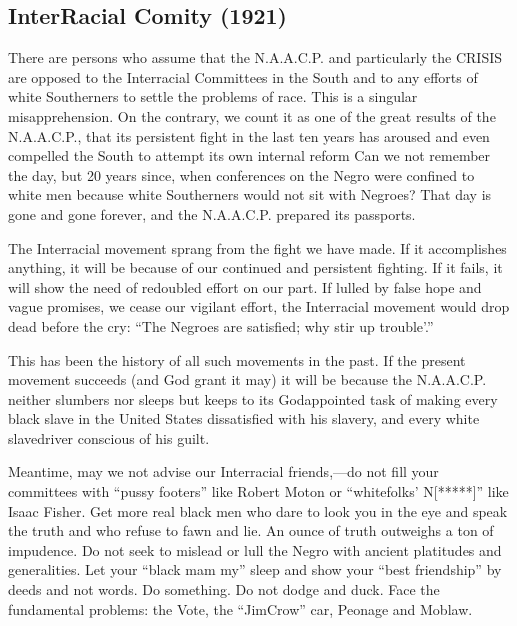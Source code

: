 \documentclass[letterpaper,10pt,english]{jupyterBook}
\begin{document}
\subsection{Inter\sphinxhyphen{}Racial Comity (1921)}
\label{\detokenize{Volumes/22/01/inter-racial_comity:inter-racial-comity-1921}}\label{\detokenize{Volumes/22/01/inter-racial_comity::doc}}
\sphinxAtStartPar
There are persons who assume that the N.A.A.C.P. and particularly the CRISIS are opposed to the Inter\sphinxhyphen{}racial Committees in the South and to any efforts of white Southerners to settle the problems of race. This is a singu­lar misapprehension. On the contrary, we count it as one of the great results of the N.A.A.C.P., that its persistent fight in the last ten years has aroused and even compelled the South to attempt its own internal reform Can we not remember the day, but 20 years since, when conferences on the Negro were confined to white men because white Southerners would not sit with Negroes? That day is gone and gone forever, and the N.A.A.C.P. prepared its passports.

\sphinxAtStartPar
The Inter\sphinxhyphen{}racial movement sprang from the fight we have made. If it accomplishes anything, it will be because of our continued and persistent fighting. If it fails, it will show the need of redoubled effort on our part. If lulled by false hope and vague promises, we cease our vigilant effort, the Inter\sphinxhyphen{}racial movement would drop dead before the cry: “The Negroes are satisfied; why stir up trouble’.”

\sphinxAtStartPar
This has been the history of all such movements in the past. If the present movement succeeds (and God grant it may) it will be because the N.A.A.C.P. neither slumbers nor sleeps but keeps to its God\sphinxhyphen{}appointed task of making every black slave in the United States dissatisfied with his slavery, and every white slave\sphinxhyphen{}driver conscious of his guilt.

\sphinxAtStartPar
Meantime, may we not advise our Inter\sphinxhyphen{}racial friends,—do not fill your committees with “pussy footers” like Robert Moton or “white\sphinxhyphen{}folks’ N{[}*****{]}” like Isaac Fisher. Get more real black men who dare to look you in the eye and speak the truth and who refuse to fawn and lie. An ounce of truth outweighs a ton of impudence. Do not seek to mislead or lull the Negro with ancient platitudes and generalities. Let your “black mam­ my” sleep and show your “best friendship” by deeds and not words. Do something. Do not dodge and duck. Face the fundamental problems: the Vote, the “Jim\sphinxhyphen{}Crow” car, Peonage and Mob\sphinxhyphen{}law.
\end{document}
